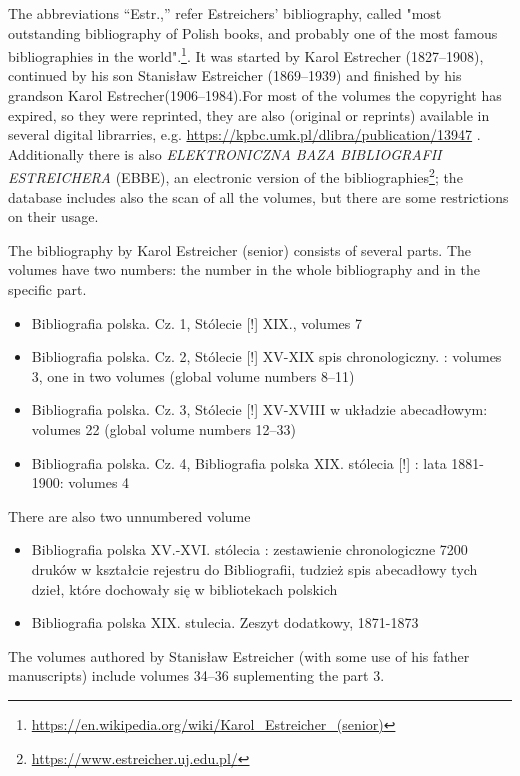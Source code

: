 \documentclass[12pt]{article}
\begin{document}
The abbreviations ``Estr.,'' refer Estreichers' bibliography, called
"most outstanding bibliography of Polish books, and probably one of
the most famous bibliographies in the
world".\footnote{\url{https://en.wikipedia.org/wiki/Karol_Estreicher_(senior)}}. It
was started by Karol Estrecher (1827--1908), continued by his son
Stanisław Estreicher (1869--1939) and finished by his grandson Karol
Estrecher(1906--1984).For most of the volumes the copyright has
expired, so they were reprinted, they are also (original or reprints)
available in several digital librarries,
e.g. \url{https://kpbc.umk.pl/dlibra/publication/13947} .
Additionally there is also \textit{ELEKTRONICZNA BAZA BIBLIOGRAFII
  ESTREICHERA} (EBBE), an electronic version of the
bibliographies\footnote{\url{https://www.estreicher.uj.edu.pl/}}; the
database includes also the scan of all the volumes, but there are some
restrictions on their usage.

The bibliography by Karol Estreicher (senior) consists of several
parts. The volumes have two numbers: the number in the whole
bibliography and in the specific part.
  \begin{itemize}
  \item Bibliografia polska. Cz. 1, Stólecie [!] XIX., volumes 7
  \item 
    Bibliografia polska. Cz. 2, Stólecie [!] XV-XIX spis chronologiczny. : volumes 3, one in
    two volumes (global volume numbers 8--11)
      \item 
    Bibliografia polska. Cz. 3, Stólecie [!] XV-XVIII w układzie
    abecadłowym: volumes 22 (global volume numbers 12--33)
  \item 
    Bibliografia polska. Cz. 4, Bibliografia polska XIX. stólecia [!] :
    lata 1881-1900: volumes 4
  \end{itemize}
  There are  also two unnumbered volume
  \begin{itemize}
  \item Bibliografia polska XV.-XVI. stólecia : zestawienie chronologiczne
    7200 druków w kształcie rejestru do Bibliografii, tudzież spis
    abecadłowy tych dzieł, które dochowały się w bibliotekach polskich
  \item 
    Bibliografia polska XIX. stulecia. Zeszyt dodatkowy, 1871-1873
  \end{itemize}

  The volumes authored by Stanisław Estreicher (with some use of his
  father manuscripts) include volumes 34--36 suplementing the part 3.
\end{document}
